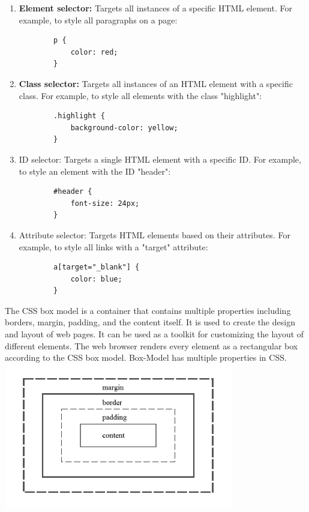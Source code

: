 \documentclass[11pt]{article}
\begin{document}
\begin{enumerate}
    \item \textbf{Element selector:} Targets all instances of a specific HTML element. For example, to style all paragraphs on a page:
    \begin{lstlisting}
        p {
            color: red;
        }
    \end{lstlisting} 
    \item \textbf{Class selector:} Targets all instances of an HTML element with a specific class. For example, to style all elements with the class "highlight":
    \begin{lstlisting}
        .highlight {
            background-color: yellow;
        }
    \end{lstlisting}
    \item ID selector: Targets a single HTML element with a specific ID. For example, to style an element with the ID "header":
    \begin{lstlisting}
        #header {
            font-size: 24px;
        }
    \end{lstlisting}
    \item Attribute selector: Targets HTML elements based on their attributes. For example, to style all links with a "target" attribute:
    \begin{lstlisting}
        a[target="_blank"] {
            color: blue;
        }  
    \end{lstlisting}

\end{enumerate}
The CSS box model is a container that contains multiple properties including borders, margin, padding, and the content itself. It is used to create the design and layout of web pages. It can be used as a toolkit for customizing the layout of different elements. The web browser renders every element as a rectangular box according to the CSS box model. Box-Model has multiple properties in CSS. \\

\includegraphics[width=0.75\textwidth]{resources/cssbox.png}
\end{document}
